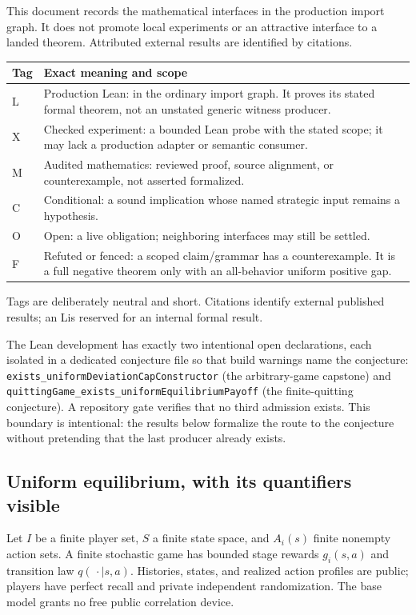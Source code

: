 \documentclass[11pt]{article}
\newcommand{\LTag}{\textsf{L}}
\newcommand{\XTag}{\textsf{X}}
\newcommand{\MTag}{\textsf{M}}
\newcommand{\CTag}{\textsf{C}}
\newcommand{\OTag}{\textsf{O}}
\newcommand{\FTag}{\textsf{F}}
\begin{document}
This document records the mathematical interfaces in the production import
graph.  It does not promote local experiments or an attractive interface to a
landed theorem.  Attributed external results are identified by citations.

\begin{longtable}{@{}p{}p{}@{}}
\toprule
Tag & Exact meaning and scope\\
\midrule
\endhead
\LTag & Production Lean: in the ordinary import graph.  It
proves its stated formal theorem, not an unstated generic witness producer.\\
\XTag & Checked experiment: a bounded Lean probe with the stated scope; it
may lack a production adapter or semantic consumer.\\
\MTag & Audited mathematics: reviewed proof, source alignment, or
counterexample, not asserted formalized.\\
\CTag & Conditional: a sound implication whose named strategic input remains
a hypothesis.\\
\OTag & Open: a live obligation; neighboring interfaces may still be settled.\\
\FTag & Refuted or fenced: a scoped claim/grammar has a counterexample.  It
is a full negative theorem only with an all-behavior uniform positive gap.\\
\bottomrule
\end{longtable}

Tags are deliberately neutral and short.  Citations identify external
published results; an \LTag is reserved for an internal formal result.

The Lean development has exactly two intentional open declarations, each
isolated in a dedicated conjecture file so that build warnings name the
conjecture: \texttt{exists\_uniformDeviationCapConstructor} (the
arbitrary-game capstone) and
\texttt{quittingGame\_exists\_uniform\-Equilibrium\-Payoff}
(the finite-quitting conjecture).  A repository gate verifies that no third
admission exists.  This boundary is intentional: the
results below formalize the route to the conjecture without pretending that
the last producer already exists.

\subsection{Uniform equilibrium, with its quantifiers visible}

Let \(I\) be a finite player set, \(S\) a finite state space, and
\(A_i(s)\) finite nonempty action sets.  A finite stochastic game has bounded
stage rewards \(g_i(s,a)\) and transition law \(q(\,\cdot\mid s,a)\).
Histories, states, and realized action profiles are public; players have
perfect recall and private independent randomization.  The base model grants
no free public correlation device.
\end{document}
